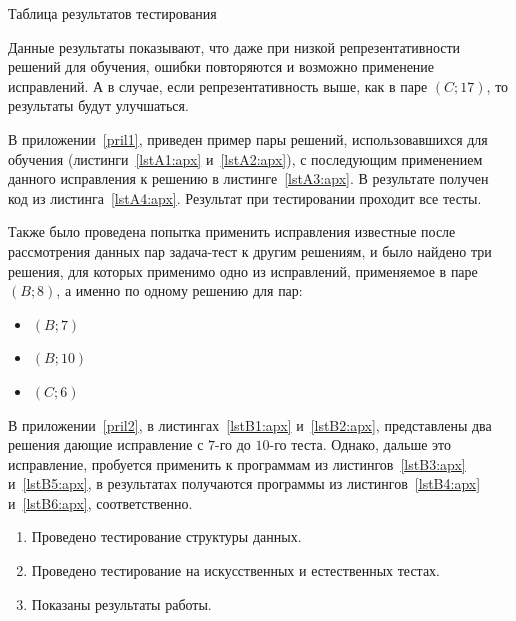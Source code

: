 \begin{table}[!h]
\caption{Таблица результатов тестирования}\label{tab1}
\centering
{}
\end{table}

Данные результаты показывают, что даже при низкой репрезентативности решений для обучения, ошибки повторяются и возможно применение
исправлений. А в случае, если репрезентативность выше, как в паре $(C;17)$, то результаты будут улучшаться.

В приложении~\ref{pril1}, приведен пример пары решений, использовавшихся для обучения (листинги~\ref{lstA1:apx} и~\ref{lstA2:apx}),
с последующим применением данного исправления к решению в листинге~\ref{lstA3:apx}. 
В результате получен код из листинга~\ref{lstA4:apx}. Результат при тестировании проходит все тесты.

Также было проведена попытка применить исправления известные после рассмотрения данных пар задача-тест к другим решениям, и было
найдено три решения, для которых применимо одно из исправлений, применяемое в паре $(B;8)$, а именно по одному решению для пар:
\begin{itemize}
\item $(B;7)$
\item $(B;10)$
\item $(C;6)$
\end{itemize}

В приложении~\ref{pril2}, в листингах~\ref{lstB1:apx} и~\ref{lstB2:apx}, представлены два решения дающие исправление
с $7$-го до $10$-го теста.
Однако, дальше это исправление, пробуется применить к программам из листингов~\ref{lstB3:apx} и~\ref{lstB5:apx}, в результатах
получаются программы из листингов~\ref{lstB4:apx} и~\ref{lstB6:apx}, соответственно. 

\chapterconclusion

\begin{enumerate}
    \item Проведено тестирование структуры данных.
    \item Проведено тестирование на искусственных и естественных тестах.
    \item Показаны результаты работы.
\end{enumerate}
